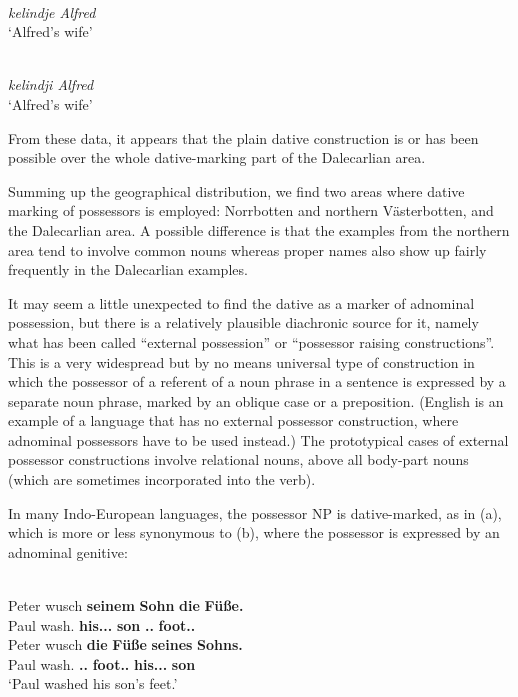 \ex 
{}\\
\gl \textit{kelindje Alfred}\\
\glt ‘Alfred’s wife’

\ex 
{}\\
\gl \textit{kelindji Alfred}\\
\glt ‘Alfred’s wife’

\z 
\z



From these data, it appears that the plain dative construction is or has been possible over the whole dative-marking part of the Dalecarlian area. 

Summing up the geographical distribution, we find two areas where dative marking of possessors is employed: Norrbotten and northern Västerbotten, and the Dalecarlian area. A possible difference is that the examples from the northern area tend to involve common nouns whereas proper names also show up fairly frequently in the Dalecarlian examples. 

It may seem a little unexpected to find the dative as a marker of adnominal possession, but there is a relatively plausible diachronic source for it, namely what has been called “external possession” or “possessor raising constructions”. This is a very widespread but by no means universal type of construction in which the possessor of a referent of a noun phrase in a sentence is expressed by a separate noun phrase, marked by an oblique case or a preposition. (English is an example of a language that has no external possessor construction, where adnominal possessors have to be used instead.) The prototypical cases of external possessor constructions involve relational nouns, above all body-part nouns (which are sometimes incorporated into the verb).

In many Indo-European languages, the possessor NP is dative-marked, as in (a), which is more or less synonymous to (b), where the possessor is expressed by an adnominal genitive:

\ea\label{}
\\
\ea 
\gll Peter  wusch  \textbf{seinem} \textbf{Sohn} \textbf{die} \textbf{Füße.}\\
Paul  wash.{\pst}  \textbf{his.{\dat}.{\m}.{\sg}} \textbf{son} \textbf{{}.{\nom}.{\pl}} \textbf{foot.{\nom}.{\pl}}\\
\ex 
\gll Peter  wusch  \textbf{die} \textbf{Füße} \textbf{seines} \textbf{Sohns.}\\
Paul  wash.{\pst}  \textbf{{}.{\nom}.{\pl}} \textbf{foot.{\nom}.{\pl}} \textbf{his.{\dat}.{\m}.{\sg}} \textbf{son}\\
\glt ‘Paul washed his son’s feet.’
\z
\z 

